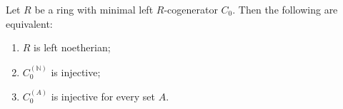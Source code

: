Let $R$ be a ring with minimal left $R$-cogenerator $C_0$. Then the following are equivalent:

\begin{enumerate}
\item[(a)] $R$ is left noetherian;
\item[(b)] $C_0^{(\mathbb{N})}$ is injective;
\item[(c)] $C_0^{(A)}$ is injective for every set $A$.
\end{enumerate}

